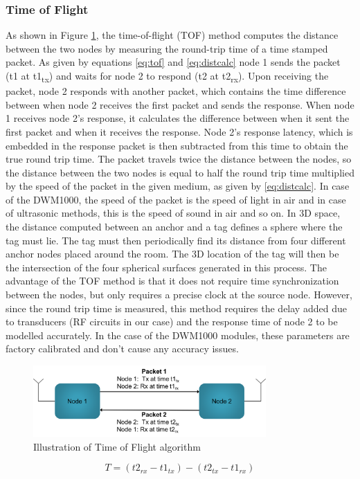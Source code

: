 \documentclass[journal,transmag]{IEEEtran}
\begin{document}
\subsubsection{Time of Flight}
As shown in Figure \ref{fig:tof}, the time-of-flight (TOF) method computes the distance between the two nodes by measuring the round-trip time of a time stamped packet.  As given by equations \ref{eq:tof} and \ref{eq:distcalc} node 1 sends the packet (t1 at t1\textsubscript{tx})  and waits for node 2 to respond (t2 at t2\textsubscript{rx}).  Upon receiving the packet, node 2 responds with another packet, which contains the time difference between when node 2 receives the first packet and sends the response.  When node 1 receives node 2's response, it calculates the difference between when it sent the first packet and when it receives the response.  Node 2's response latency, which is embedded in the response packet is then subtracted from this time to obtain the true round trip time.  The packet travels twice the distance between the nodes, so the distance between the two nodes is equal to half the round trip time multiplied by the speed of the packet in the given medium, as given by \ref{eq:distcalc}.  In case of the DWM1000, the speed of the packet is the speed of light in air and in case of ultrasonic methods, this is the speed of sound in air and so on.  In 3D space, the distance computed between an anchor and a tag defines a sphere where the tag must lie.  The tag must then periodically find its distance from four different anchor nodes placed around the room.  The 3D location of the tag will then be the intersection of the four spherical surfaces generated in this process.  The advantage of the TOF method is that it does not require time synchronization between the nodes, but only requires a precise clock at the source node.  However, since the round trip time is measured, this method requires the delay added due to transducers (RF circuits in our case) and the response time of node 2 to be modelled accurately.  In the case of the DWM1000 modules, these parameters are factory calibrated and don't cause any accuracy issues.  


\begin{figure}[!h]
\centering
\includegraphics[width=3.5in]{tof.png}
\caption{{Illustration of Time of Flight algorithm}}
\label{fig:tof}
\end{figure}
\begin{equation}
\label{eq:tof}
    T = (t2_{rx} - t1_{tx}) - (t2_{tx} - t1_{rx})
\end{equation}
\end{document}
